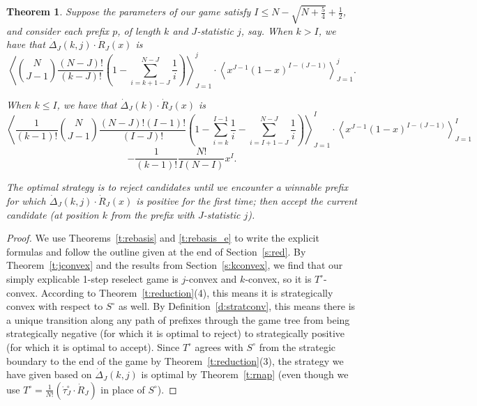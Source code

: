 \documentclass[11pt]{amsart}   %
\newtheorem{theorem}{Theorem}[section]
\theoremstyle{definition}
\theoremstyle{remark}
\numberwithin{equation}{section}
\theoremstyle{theorem}
\begin{document}
\begin{theorem}\label{t:themain}
Suppose the parameters of our game satisfy $I \leq N - \sqrt{N+\frac{5}{4}} +
\frac{1}{2}$, and consider each prefix $p$, of length $k$ and $J$-statistic $j$,
say.  When $k > I$, we have that $\dot\Delta_J(k, j) \cdot \dot{R}_J(x)$ is
\[ \left\langle {N \choose {J-1}} \frac{(N-J)!}{(k-J)!}  \left( 1-\sum_{i=k+1-J}^{N-J} \frac{1}{i} \right)\right\rangle_{J=1}^j \cdot \left\langle x^{J-1}(1-x)^{I-(J-1)} \right\rangle_{J=1}^j. \]

When $k \leq I$, we have that $\dot\Delta_J(k) \cdot \dot{R}_J(x)$ is
\[ \left\langle \frac{1}{(k-1)!} {N \choose {J-1}} \frac{(N-J)!(I-1)!}{(I-J)!}  \left( 1-\sum_{i=k}^{I-1} \frac{1}{i}-\sum_{i=I+1-J}^{N-J} \frac{1}{i} \right)\right\rangle_{J=1}^I \cdot \left\langle x^{J-1}(1-x)^{I-(J-1)} \right\rangle_{J=1}^I \]
\[ - \frac{1}{(k-1)!} \frac{N!}{I (N-I)} x^I. \]

The optimal strategy is to reject candidates until we encounter a winnable
prefix for which $\dot\Delta_J(k, j)\cdot\dot{R}_J(x)$ is positive for the
first time; then accept the current candidate (at position $k$ from the prefix
with $J$-statistic $j$).
\end{theorem}
\begin{proof}
    We use Theorems~\ref{t:rebasis} and \ref{t:rebasis_e} to write the explicit formulas and follow the outline given at the end of Section~\ref{s:red}.  By Theorem~\ref{t:jconvex} and the results from Section~\ref{s:kconvex}, we find that our simply explicable 1-step reselect game is $j$-convex and $k$-convex, so it is $T^\circ$-convex.  According to Theorem~\ref{t:reduction}(4), this means it is strategically convex with respect to $S^\circ$ as well.  By Definition~\ref{d:stratconv}, this means there is a unique transition along any path of prefixes through the game tree from being strategically negative (for which it is optimal to reject) to strategically positive (for which it is optimal to accept).  Since $T^\circ$ agrees with $S^\circ$ from the strategic boundary to the end of the game by Theorem~\ref{t:reduction}(3), the strategy we have given based on $\dot\Delta_J(k, j)$ is optimal by Theorem~\ref{t:rnap} (even though we use $T^\circ = \frac{1}{N!} \left(\dot\tau_J^\circ \cdot \dot{R}_J\right)$ in place of $S^\circ$).
\end{proof}
\end{document}
